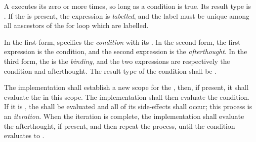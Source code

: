\specsubsubitem
A  executes its  zero or
more times, so long as a condition is true. Its result type is .
If the  is present, the expression is \textit{labelled}, and
the label must be unique among all anscestors of the for loop which are
labelled.

\specsubsubitem
In the first form,  specifies the \textit{condition}
with its . In the second form, the first
expression is the condition, and the second expression is the
\textit{afterthought}. In the third form, the  is the
\textit{binding}, and the two expressions are respectively the condition and
afterthought. The result type of the condition shall be .

\specsubsubitem
The implementation shall establish a new scope for the
, then, if present, it shall evaluate the
 in this scope. The implementation shall then evaluate the
condition. If it is , the 
shall be evaluated and all of its side-effects shall occur; this process is an
\textit{iteration}. When the iteration is complete, the implementation shall
evaluate the afterthought, if present, and then repeat the process, until the
condition evaluates to .




\begin{grammar}
 \\
	   \\
	  \\

 \\
	 \optional{\terminal{,}} \\
	 \terminal{,}  \\

 \\
	 \terminal{=}  \\
	 \terminal{:}  \terminal{=}  \\
\end{grammar}

